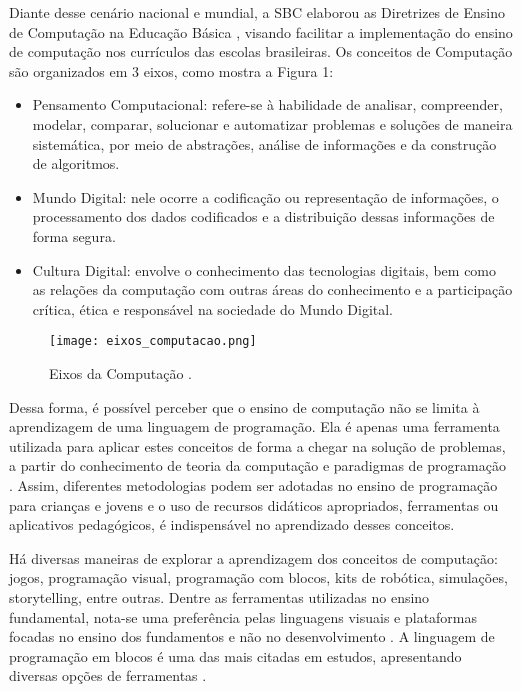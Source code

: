 Diante desse cenário nacional e mundial, a SBC elaborou as Diretrizes de Ensino de Computação na Educação Básica \citep{ribeiro2019diretrizes}, visando facilitar a implementação do ensino de computação nos currículos das escolas brasileiras. Os conceitos de Computação são organizados em 3 eixos, como mostra a Figura 1:

\begin{itemize}
    \item Pensamento Computacional: refere-se à habilidade de analisar, compreender, modelar, comparar, solucionar e automatizar problemas e soluções de maneira sistemática, por meio de abstrações, análise de informações e da construção de algoritmos. 
    \item Mundo Digital: nele ocorre a codificação ou representação de informações, o processamento dos dados codificados e a distribuição dessas informações de forma segura.
    \item Cultura Digital: envolve o conhecimento das tecnologias digitais, bem como as relações da computação com outras áreas do conhecimento e a participação crítica, ética e responsável na sociedade do Mundo Digital.
\end{itemize}

\begin{figure}[h!]
    \centering
    \texttt{[image: eixos\_computacao.png]}
    \caption{Eixos da Computação \citep{ribeiro2019diretrizes}.}
    \label{figure:eixos_computacao}
\end{figure}

Dessa forma, é possível perceber que o ensino de computação não se limita à aprendizagem de uma linguagem de programação. Ela é apenas uma ferramenta utilizada para aplicar estes conceitos de forma a chegar na solução de problemas, a partir do conhecimento de teoria da computação e paradigmas de programação \citep{blatt2017mapeamento}. Assim, diferentes metodologias podem ser adotadas no ensino de programação para crianças e jovens e o uso de recursos didáticos apropriados, ferramentas ou aplicativos pedagógicos, é indispensável no aprendizado desses conceitos.

Há diversas maneiras de explorar a aprendizagem dos conceitos de computação: jogos, programação visual, programação com blocos, kits de robótica, simulações, storytelling, entre outras. Dentre as ferramentas utilizadas no ensino fundamental, nota-se uma preferência pelas linguagens visuais e plataformas focadas no ensino dos fundamentos e não no desenvolvimento \citep{gomes2017ensino}. A linguagem de programação em blocos é uma das mais citadas em estudos, apresentando diversas opções de ferramentas \citep{brezolin2021panorama,desouza2021ensino}. 

